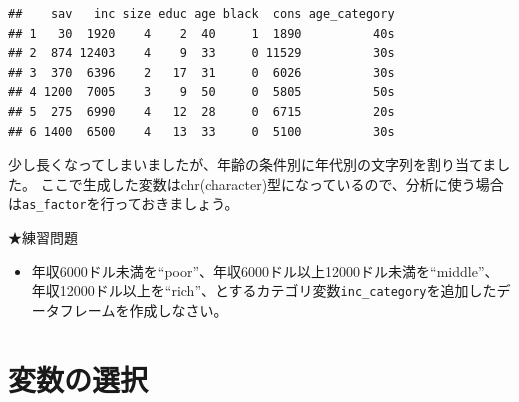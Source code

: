 \documentclass[]{book}
\newenvironment{Shaded}{\begin{snugshade}}{\end{snugshade}}
\newcommand{\KeywordTok}[1]{\textcolor[rgb]{0.13,0.29,0.53}{\textbf{#1}}}
\newcommand{\DataTypeTok}[1]{\textcolor[rgb]{0.13,0.29,0.53}{#1}}
\newcommand{\DecValTok}[1]{\textcolor[rgb]{0.00,0.00,0.81}{#1}}
\newcommand{\StringTok}[1]{\textcolor[rgb]{0.31,0.60,0.02}{#1}}
\newcommand{\OperatorTok}[1]{\textcolor[rgb]{0.81,0.36,0.00}{\textbf{#1}}}
\newcommand{\NormalTok}[1]{#1}
\providecommand{\tightlist}{%
  \setlength{\itemsep}{0pt}\setlength{\parskip}{0pt}}
\begin{document}
\begin{Shaded}
\end{Shaded}

\begin{verbatim}
##    sav   inc size educ age black  cons age_category
## 1   30  1920    4    2  40     1  1890          40s
## 2  874 12403    4    9  33     0 11529          30s
## 3  370  6396    2   17  31     0  6026          30s
## 4 1200  7005    3    9  50     0  5805          50s
## 5  275  6990    4   12  28     0  6715          20s
## 6 1400  6500    4   13  33     0  5100          30s
\end{verbatim}

少し長くなってしまいましたが、年齢の条件別に年代別の文字列を割り当てました。
ここで生成した変数はchr(character)型になっているので、分析に使う場合は\texttt{as\_factor}を行っておきましょう。

★練習問題

\begin{itemize}
\tightlist
\item
  年収6000ドル未満を``poor''、年収6000ドル以上12000ドル未満を``middle''、
  年収12000ドル以上を``rich''、とするカテゴリ変数\texttt{inc\_category}を追加したデータフレームを作成しなさい。
\end{itemize}

\section{変数の選択}\label{ux5909ux6570ux306eux9078ux629e}
\end{document}
